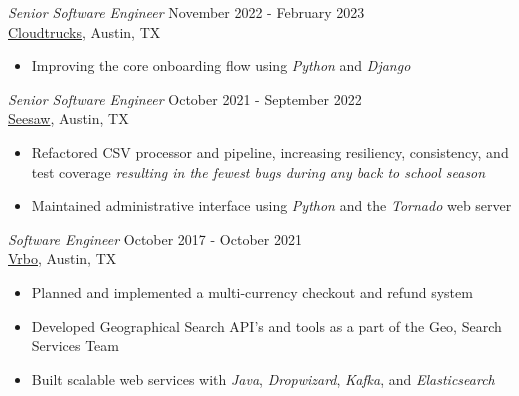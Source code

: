 \documentclass[margin, 9pt]{res} %
\begin{document}
\begin{resume}
{\sl Senior Software Engineer} \hfill November 2022 - February 2023 \\
\href{https://www.cloudtrucks.com/}{Cloudtrucks}, Austin, TX
\begin{itemize}
    \item Improving the core onboarding flow using {\it Python} and {\it Django}
\end{itemize}

{\sl Senior Software Engineer} \hfill October 2021 - September 2022 \\
\href{https://web.seesaw.me/}{Seesaw}, Austin, TX
\begin{itemize}
    \item Refactored CSV processor and pipeline, increasing resiliency, consistency, and test coverage {\it resulting in the fewest bugs during any back to school season}
    \item Maintained administrative interface using {\it Python} and the {\it Tornado} web server
\end{itemize}

{\sl Software Engineer} \hfill October 2017 - October 2021 \\
\href{https://www.vrbo.com/}{Vrbo}, Austin, TX
\begin{itemize}
    \item Planned and implemented a multi-currency checkout and refund system
    \item Developed Geographical Search API's and tools as a part of the Geo, Search Services Team
    \item Built scalable web services with {\it Java}, {\it Dropwizard}, {\it Kafka}, and {\it Elasticsearch}
\end{itemize}



\end{resume}
\end{document}
